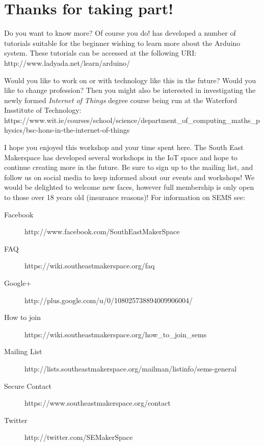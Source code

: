 \newpage
\chapter*{Thanks for taking part!}

Do you want to know more? Of course you do! \citet{fried-12} has developed a number of tutorials suitable for the beginner wishing to learn more about the \gls{Arduino} system. These tutorials can be accessed at the following URI: http://www.ladyada.net/learn/arduino/

Would you like to work on or with technology like this in the future? Would you like to change profession? Then you might also be interested in investigating the newly formed \textit{Internet of Things} degree course being run at the Waterford Insstitute of Technology: https://www.wit.ie/courses/school/science/department\_of\_computing\_maths\_physics/bsc-hons-in-the-internet-of-things

I hope you enjoyed this workshop and your time spent here. The South East Makerspace has developed several workshops in the IoT space and hope to continue creating more in the future. Be sure to sign up to the mailing list, and follow us on social media to keep informed about our events and workshops! We would be delighted to welcome new faces, however full membership is only open to those over 18 years old (insurance reasons)! For information on SEMS see:

\begin{description}
	\item[Facebook] http://www.facebook.com/SouthEastMakerSpace
	\item[FAQ] https://wiki.southeastmakerspace.org/faq
	\item[Google+] http://plus.google.com/u/0/108025738894009906004/
	\item[How to join] https://wiki.southeastmakerspace.org/how\_to\_join\_sems
	\item[Mailing List] http://lists.southeastmakerspace.org/mailman/listinfo/sems-general
	\item[Secure Contact] https://www.southeastmakerspace.org/contact
	\item[Twitter] http://twitter.com/SEMakerSpace
\end{description} 




